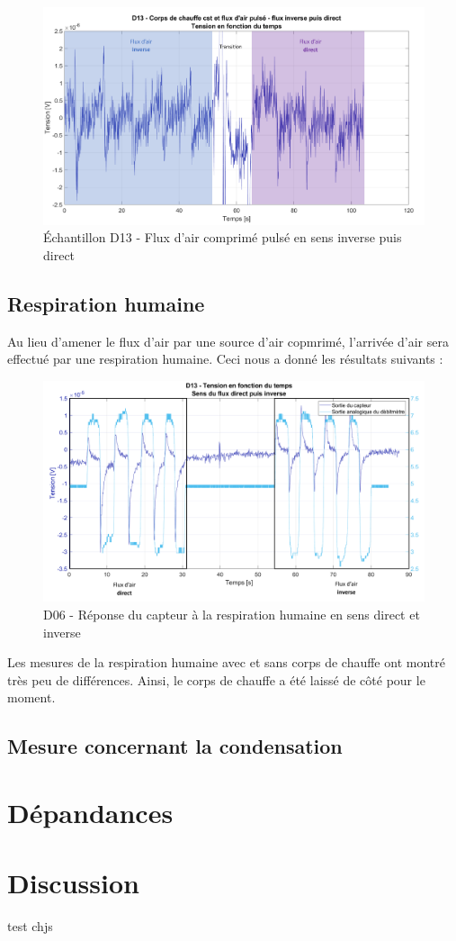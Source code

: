 \begin{figure}[H]
    \centering
    \includegraphics[scale = 0.6]{assets/figures/D13_air_comprime_pulse_blue.pdf}
    \caption*{Échantillon D13 - Flux d'air comprimé pulsé en sens inverse puis direct}
    \label{fig:D13_air_comp_pulse}
\end{figure}

\subsection{Respiration humaine}
Au lieu d'amener le flux d'air par une source d'air copmrimé, l'arrivée d'air sera effectué par une respiration humaine. Ceci nous a donné les résultats suivants :

\begin{figure}[H]
    \centering
    \includegraphics[scale = 0.6]{assets/figures/D13_human_breath_direct_invert_blue.pdf}
    \caption{D06 - Réponse du capteur à la respiration humaine en sens direct et inverse}
    \label{fig:D13_human_breath_direct_invert}
\end{figure}

Les mesures de la respiration humaine avec et sans corps de chauffe ont montré très peu de différences. Ainsi, le corps de chauffe a été laissé 
de côté pour le moment. 

\subsection{Mesure concernant la condensation}

\section{Dépandances}
\section{Discussion}
test chjs